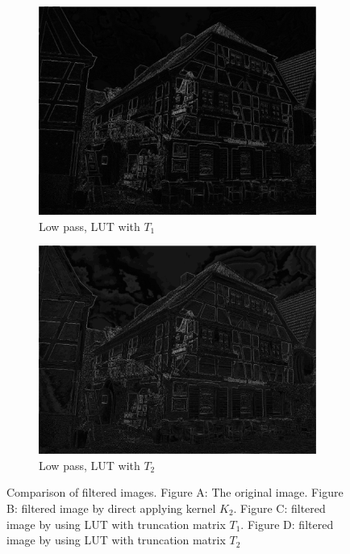 \documentclass[12pt]{amsart}
\theoremstyle{definition}
\theoremstyle{remark}
\numberwithin{thm}{section}
\begin{document}
\begin{figure}[h]
\begin{subfigure}[b]{0.4\textwidth} \includegraphics[width=\textwidth]{house_lut_212.png} \caption{Low pass, LUT with $T_1$} %
\end{subfigure}
\begin{subfigure}[b]{0.4\textwidth} \includegraphics[width=\textwidth]{house_lut_424.png} \caption{Low pass, LUT with $T_2$} \end{subfigure}
\caption{Comparison of filtered images. Figure A: The original image. Figure B: filtered image by direct applying kernel $K_2$. Figure C: filtered image by using LUT with truncation matrix $T_1$. Figure D: filtered image by using LUT with truncation matrix $T_2$}
\label{fig:house} 
\end{figure}
\end{document}
